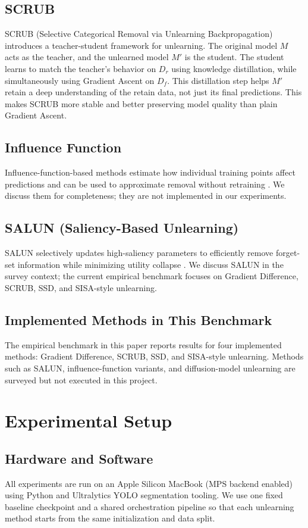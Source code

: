 \documentclass[conference]{IEEEtran}
\begin{document}
\subsection{SCRUB}\label{SCM}
SCRUB (Selective Categorical Removal via Unlearning Backpropagation) \cite{kurmanji2023} introduces a teacher-student framework for unlearning. The original model \(M\) acts as the teacher, and the unlearned model \(M'\) is the student. The student learns to match the teacher's behavior on \(D_r\) using knowledge distillation, while simultaneously using Gradient Ascent on \(D_f\). This distillation step helps \(M'\) retain a deep understanding of the retain data, not just its final predictions. This makes SCRUB more stable and better preserving model quality than plain Gradient Ascent. 

\subsection{Influence Function}
Influence-function-based methods estimate how individual training points affect predictions and can be used to approximate removal without retraining \cite{koh2017}. We discuss them for completeness; they are not implemented in our experiments.

\subsection{SALUN (Saliency-Based Unlearning)}
SALUN selectively updates high-saliency parameters to efficiently remove forget-set information while minimizing utility collapse \cite{fan2024}. We discuss SALUN in the survey context; the current empirical benchmark focuses on Gradient Difference, SCRUB, SSD, and SISA-style unlearning.

\subsection{Implemented Methods in This Benchmark}
The empirical benchmark in this paper reports results for four implemented methods: Gradient Difference, SCRUB, SSD, and SISA-style unlearning. Methods such as SALUN, influence-function variants, and diffusion-model unlearning are surveyed but not executed in this project.

\section{Experimental Setup}
\subsection{Hardware and Software}
All experiments are run on an Apple Silicon MacBook (MPS backend enabled) using Python and Ultralytics YOLO segmentation tooling. We use one fixed baseline checkpoint and a shared orchestration pipeline so that each unlearning method starts from the same initialization and data split.
\end{document}
